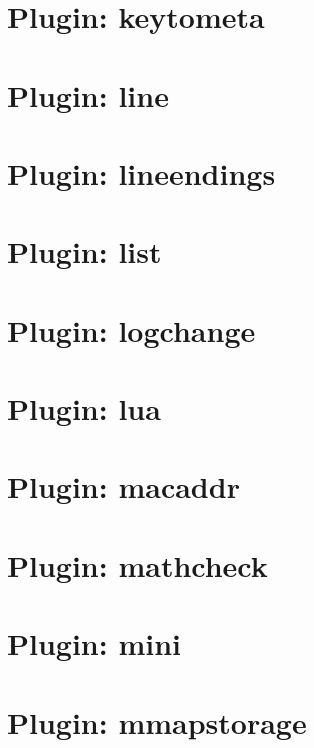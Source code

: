 \documentclass[twoside]{book}
\newcommand{\+}{\discretionary{\mbox{\scriptsize$\hookleftarrow$}}{}{}}
\begin{document}
\chapter{Plugin\+: keytometa}
\label{autotoc_md366}

\chapter{Plugin\+: line}
\label{autotoc_md374}

\chapter{Plugin\+: lineendings}
\label{autotoc_md384}

\chapter{Plugin\+: list}
\label{autotoc_md386}

\chapter{Plugin\+: logchange}
\label{autotoc_md390}

\chapter{Plugin\+: lua}
\label{autotoc_md392}

\chapter{Plugin\+: macaddr}
\label{autotoc_md397}

\chapter{Plugin\+: mathcheck}
\label{autotoc_md401}

\chapter{Plugin\+: mini}
\label{autotoc_md404}

\chapter{Plugin\+: mmapstorage}
\label{autotoc_md431}

\end{document}
